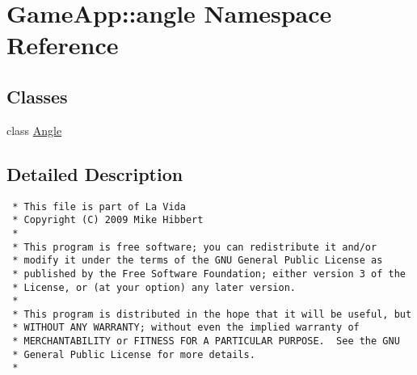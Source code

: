 \hypertarget{namespaceGameApp_1_1angle}{
\section{GameApp::angle Namespace Reference}
\label{namespaceGameApp_1_1angle}
}


\subsection*{Classes}
\begin{CompactItemize}
\item 
class \hyperlink{classGameApp_1_1angle_1_1Angle}{Angle}
\end{CompactItemize}


\subsection{Detailed Description}


\footnotesize\begin{verbatim}
 * This file is part of La Vida
 * Copyright (C) 2009 Mike Hibbert
 *
 * This program is free software; you can redistribute it and/or
 * modify it under the terms of the GNU General Public License as
 * published by the Free Software Foundation; either version 3 of the
 * License, or (at your option) any later version.
 *
 * This program is distributed in the hope that it will be useful, but
 * WITHOUT ANY WARRANTY; without even the implied warranty of
 * MERCHANTABILITY or FITNESS FOR A PARTICULAR PURPOSE.  See the GNU
 * General Public License for more details.
 *
\end{verbatim}
\normalsize
 